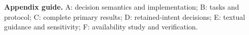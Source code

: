 \noindent\textbf{Appendix guide.} A: decision semantics and implementation; B: tasks and protocol;
C: complete primary results; D: retained-intent decisions;
E: textual guidance and sensitivity; F: availability study and verification.







